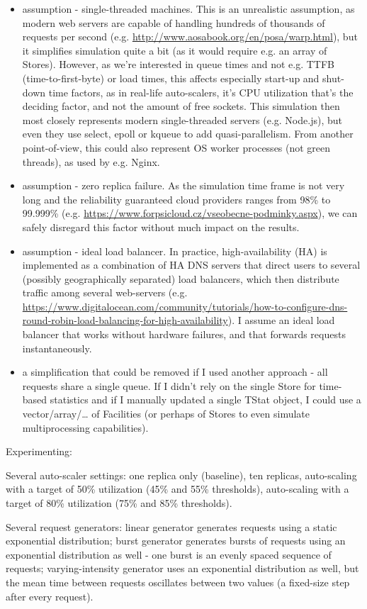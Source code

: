 \documentclass{scrartcl}
\begin{document}
\begin{itemize}
\item assumption - single-threaded machines. This is an unrealistic assumption, as
modern web servers are capable of handling hundreds of thousands of requests
per second (e.g. \url{http://www.aosabook.org/en/posa/warp.html}), but it simplifies
simulation quite a bit (as it would require e.g. an array of Stores). However,
as we're interested in queue times and not e.g. TTFB (time-to-first-byte) or
load times, this affects especially start-up and shut-down time factors, as in
real-life auto-scalers, it's CPU utilization that's the deciding factor, and
not the amount of free sockets. This simulation then most closely represents
modern single-threaded servers (e.g. Node.js), but even they use select, epoll
or kqueue to add quasi-parallelism. From another point-of-view, this could
also represent OS worker processes (not green threads), as used by e.g. Nginx.
\item assumption - zero replica failure. As the simulation time frame is not very
long and the reliability guaranteed cloud providers ranges from 98\% to 99.999\%
(e.g. \url{https://www.forpsicloud.cz/vseobecne-podminky.aspx}), we can safely
disregard this factor without much impact on the results.
\item assumption - ideal load balancer. In practice, high-availability (HA) is
implemented as a combination of HA DNS servers that direct users to several
(possibly geographically separated) load balancers, which then distribute
traffic among several web-servers
(e.g. \url{https://www.digitalocean.com/community/tutorials/how-to-configure-dns-round-robin-load-balancing-for-high-availability}). I
assume an ideal load balancer that works without hardware failures, and
that forwards requests instantaneously.
\item a simplification that could be removed if I used another approach - all
requests share a single queue. If I didn't rely on the single Store for
time-based statistics and if I manually updated a single TStat object, I could
use a vector/array/\ldots{} of Facilities (or perhaps of Stores to even simulate
multiprocessing capabilities).
\end{itemize}

Experimenting:

Several auto-scaler settings: one replica only (baseline), ten replicas,
auto-scaling with a target of 50\% utilization (45\% and 55\% thresholds),
auto-scaling with a target of 80\% utilization (75\% and 85\% thresholds).

Several request generators: linear generator generates requests using a static
exponential distribution; burst generator generates bursts of requests using an
exponential distribution as well - one burst is an evenly spaced sequence of
requests; varying-intensity generator uses an exponential distribution as well,
but the mean time between requests oscillates between two values (a fixed-size
step after every request).
\end{document}
